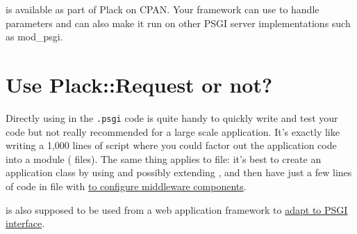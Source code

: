  is available as part of Plack on CPAN. Your framework can
use  to handle parameters and can also make it run on
other PSGI server implementations such as mod\_psgi.

\section{Use Plack::Request or not?}\label{use-plackrequest-or-not}

Directly using  in the \lstinline!.psgi! code is quite
handy to quickly write and test your code but not really recommended for
a large scale application. It's exactly like writing a 1{,}000 lines of
 script where you could factor out the application code
into a module ( files). The same thing applies to
 file: it's best to create an application class by
using and possibly extending , and then have just a few
lines of code in  file with
\href{http://advent.plackperl.org/2009/12/day-11-using-plackbuilder.html}{
to configure middleware components}.

 is also supposed to be used from a web application
framework to
\href{http://advent.plackperl.org/2009/12/day-8-adapting-web-frameworks-to-psgi.html}{adapt
to PSGI interface}.

